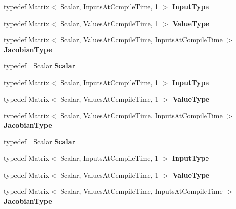 \begin{DoxyCompactItemize}
\mbox{\label{struct_functor_a31735f0c889a1cb1aabacd873dc9633d}} 
typedef Matrix$<$ Scalar, Inputs\+At\+Compile\+Time, 1 $>$ {\bfseries Input\+Type}
\item 
\mbox{\label{struct_functor_a45facfd3140f9f185fe3b64347ef250c}} 
typedef Matrix$<$ Scalar, Values\+At\+Compile\+Time, 1 $>$ {\bfseries Value\+Type}
\item 
\mbox{\label{struct_functor_aaa52be4c1b359195253672350664bc92}} 
typedef Matrix$<$ Scalar, Values\+At\+Compile\+Time, Inputs\+At\+Compile\+Time $>$ {\bfseries Jacobian\+Type}
\item 
\mbox{\label{struct_functor_a9690bcfe4a9698846510bcc449194c6a}} 
typedef \+\_\+\+Scalar {\bfseries Scalar}
\item 
\mbox{\label{struct_functor_a31735f0c889a1cb1aabacd873dc9633d}} 
typedef Matrix$<$ Scalar, Inputs\+At\+Compile\+Time, 1 $>$ {\bfseries Input\+Type}
\item 
\mbox{\label{struct_functor_a45facfd3140f9f185fe3b64347ef250c}} 
typedef Matrix$<$ Scalar, Values\+At\+Compile\+Time, 1 $>$ {\bfseries Value\+Type}
\item 
\mbox{\label{struct_functor_aaa52be4c1b359195253672350664bc92}} 
typedef Matrix$<$ Scalar, Values\+At\+Compile\+Time, Inputs\+At\+Compile\+Time $>$ {\bfseries Jacobian\+Type}
\item 
\mbox{\label{struct_functor_a9690bcfe4a9698846510bcc449194c6a}} 
typedef \+\_\+\+Scalar {\bfseries Scalar}
\item 
\mbox{\label{struct_functor_a31735f0c889a1cb1aabacd873dc9633d}} 
typedef Matrix$<$ Scalar, Inputs\+At\+Compile\+Time, 1 $>$ {\bfseries Input\+Type}
\item 
\mbox{\label{struct_functor_a45facfd3140f9f185fe3b64347ef250c}} 
typedef Matrix$<$ Scalar, Values\+At\+Compile\+Time, 1 $>$ {\bfseries Value\+Type}
\item 
\mbox{\label{struct_functor_aaa52be4c1b359195253672350664bc92}} 
typedef Matrix$<$ Scalar, Values\+At\+Compile\+Time, Inputs\+At\+Compile\+Time $>$ {\bfseries Jacobian\+Type}
\end{DoxyCompactItemize}
